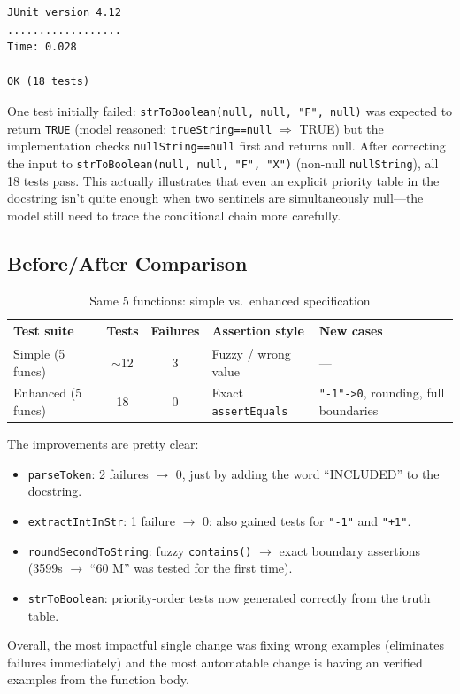 \documentclass[acmsmall,nonacm]{acmart}
\begin{document}
\begin{lstlisting}[style=shell, caption={Test execution for LLMEnhancedTest}]
JUnit version 4.12
..................
Time: 0.028

OK (18 tests)
\end{lstlisting}

One test initially failed: \texttt{strToBoolean(null, null, "F", null)} was expected to
return \texttt{TRUE} (model reasoned: \texttt{trueString==null} $\Rightarrow$ TRUE) but
the implementation checks \texttt{nullString==null} first and returns null. After correcting
the input to \texttt{strToBoolean(null, null, "F", "X")} (non-null \texttt{nullString}),
all 18 tests pass. This actually illustrates that even an explicit priority table in the docstring
isn't quite enough when two sentinels are simultaneously null---the model still need to trace
the conditional chain more carefully.

\subsection{Before/After Comparison}

\begin{table}[h]
\centering
\begin{tabular}{lccll}
\toprule
\textbf{Test suite} & \textbf{Tests} & \textbf{Failures} & \textbf{Assertion style} & \textbf{New cases} \\
\midrule
Simple (5 funcs)   & $\sim$12 & 3 & Fuzzy / wrong value & --- \\
Enhanced (5 funcs) & 18       & 0 & Exact \texttt{assertEquals} & \texttt{"-1"->0}, rounding, full boundaries \\
\bottomrule
\end{tabular}
\caption{Same 5 functions: simple vs.\ enhanced specification}
\end{table}

The improvements are pretty clear:
\begin{itemize}
  \item \texttt{parseToken}: 2 failures $\to$ 0, just by adding the word ``INCLUDED'' to the docstring.
  \item \texttt{extractIntInStr}: 1 failure $\to$ 0; also gained tests for \texttt{"-1"} and \texttt{"+1"}.
  \item \texttt{roundSecondToString}: fuzzy \texttt{contains()} $\to$ exact boundary assertions
        (3599s $\to$ ``60 M'' was tested for the first time).
  \item \texttt{strToBoolean}: priority-order tests now generated correctly from the truth table.
\end{itemize}

Overall, the most impactful single change was fixing wrong examples (eliminates failures immediately)
and the most automatable change is having an verified examples from the function body.
\end{document}
